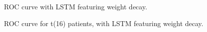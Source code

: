     \begin{figure}[ht]
      \centering
      \caption{ROC curve with LSTM featuring weight decay.}
      \label{graph:roc-LSTM-weight-decay}
   \end{figure}
   
   
       \begin{figure}[ht]
      \centering
      \caption{ROC curve for t(16) patients, with LSTM featuring weight decay.}
      \label{graph:roc-LSTM-16-threshold}
   \end{figure}


